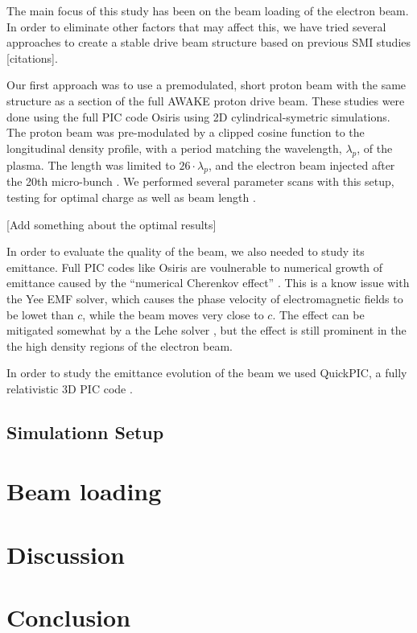 \documentclass[aps,prstab,reprint,amsmath,amssymb,groupedaddress]{revtex4-1}
\begin{document}
The main focus of this study has been on the beam loading of the electron beam. In order to eliminate other factors that may affect this, we have tried several approaches to create a stable drive beam structure based on previous SMI studies [citations].

Our first approach was to use a premodulated, short proton beam with the same structure as a section of the full AWAKE proton drive beam. These studies were done using the full PIC code Osiris \cite{fonseca:2002} using 2D cylindrical-symetric simulations. The proton beam was pre-modulated by a clipped cosine function to the longitudinal density profile, with a period matching the wavelength, $\lambda_p$, of the plasma. The length was limited to $26\cdot\lambda_p$, and the electron beam injected after the 20th micro-bunch \cite{berglyd_olsen:2015}. We performed several parameter scans with this setup, testing for optimal charge as well as beam length \cite{adli:2016, berglyd_olsen:2016}.

[Add something about the optimal results]

In order to evaluate the quality of the beam, we also needed to study its emittance. Full PIC codes like Osiris are voulnerable to numerical growth of emittance caused by the ``numerical Cherenkov effect'' \cite{godfrey:1974}. This is a know issue with the Yee EMF solver, which causes the phase velocity of electromagnetic fields to be lowet than $c$, while the beam moves very close to $c$. The effect can be mitigated somewhat by a the Lehe solver \cite{lehe:2013}, but the effect is still prominent in the the high density regions of the electron beam.

In order to study the emittance evolution of the beam we used QuickPIC, a fully relativistic 3D PIC code \cite{huang:2006, an:2013}.

\subsection[\label{S:M:Setup}]{Simulationn Setup}



\section[\label{S:BL}]{Beam loading}


\section[\label{S:D}]{Discussion}
\section[\label{S:C}]{Conclusion}




\end{document}
